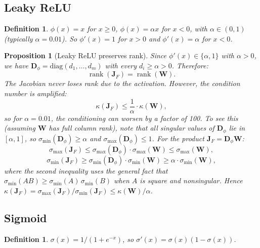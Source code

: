 \documentclass[11pt,a4paper]{article}
\newtheorem{proposition}[theorem]{Proposition}
\newtheorem{definition}[theorem]{Definition}
\theoremstyle{remark}
\begin{document}
\subsection{Leaky ReLU}

\begin{definition}
$\phi(x) = x$ for $x \geq 0$, $\phi(x) = \alpha x$ for $x < 0$, with $\alpha \in (0, 1)$ (typically $\alpha = 0.01$).
So $\phi'(x) = 1$ for $x > 0$ and $\phi'(x) = \alpha$ for $x < 0$.
\end{definition}

\begin{proposition}[Leaky ReLU preserves rank]
\label{prop:leaky-rank}
Since $\phi'(x) \in \{\alpha, 1\}$ with $\alpha > 0$, we have $\mathbf{D}_\phi = \mathrm{diag}(d_1, \dots, d_m)$ with every $d_i \geq \alpha > 0$.
Therefore:
\[
  \operatorname{rank}(\mathbf{J}_F) = \operatorname{rank}(\mathbf{W}).
\]
The Jacobian never loses rank due to the activation.  However, the condition number is amplified:
\begin{equation}
  \kappa(\mathbf{J}_F) \leq \frac{1}{\alpha} \cdot \kappa(\mathbf{W}),
  \label{eq:leaky-cond}
\end{equation}
so for $\alpha = 0.01$, the conditioning can worsen by a factor of 100.
To see this (assuming $\mathbf{W}$ has full column rank), note that all singular values of $\mathbf{D}_\phi$ lie in $[\alpha, 1]$, so $\sigma_{\min}(\mathbf{D}_\phi) \geq \alpha$ and $\sigma_{\max}(\mathbf{D}_\phi) \leq 1$.
For the product $\mathbf{J}_F = \mathbf{D}_\phi \mathbf{W}$:
\[
  \sigma_{\max}(\mathbf{J}_F) \leq \sigma_{\max}(\mathbf{D}_\phi) \cdot \sigma_{\max}(\mathbf{W}) \leq \sigma_{\max}(\mathbf{W}),
\]
\[
  \sigma_{\min}(\mathbf{J}_F) \geq \sigma_{\min}(\mathbf{D}_\phi) \cdot \sigma_{\min}(\mathbf{W}) \geq \alpha \cdot \sigma_{\min}(\mathbf{W}),
\]
where the second inequality uses the general fact that $\sigma_{\min}(AB) \geq \sigma_{\min}(A)\,\sigma_{\min}(B)$ when $A$ is square and nonsingular.
Hence $\kappa(\mathbf{J}_F) = \sigma_{\max}(\mathbf{J}_F)/\sigma_{\min}(\mathbf{J}_F) \leq \kappa(\mathbf{W})/\alpha$.
\end{proposition}

\subsection{Sigmoid}

\begin{definition}
$\sigma(x) = 1/(1 + e^{-x})$, so $\sigma'(x) = \sigma(x)(1 - \sigma(x))$.
\end{definition}
\end{document}
